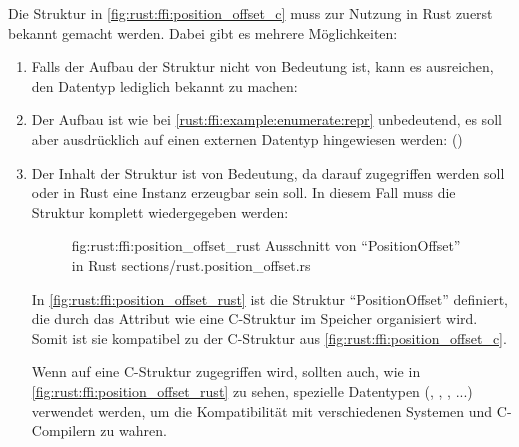 Die Struktur in \autoref{fig:rust:ffi:position_offset_c} muss zur Nutzung in Rust zuerst bekannt gemacht werden.
Dabei gibt es mehrere Möglichkeiten:
\begin{enumerate}
	\item Falls der Aufbau der Struktur nicht von Bedeutung ist, kann es ausreichen, den Datentyp lediglich bekannt zu machen:  \label{rust:ffi:example:enumerate:repr}
	
	\item Der Aufbau ist wie bei \autoref{rust:ffi:example:enumerate:repr} unbedeutend, es soll aber ausdrücklich auf einen externen Datentyp hingewiesen werden:  \cite{rust:github:extern_type} ()
	
	\item Der Inhalt der Struktur ist von Bedeutung, da darauf zugegriffen werden soll oder in Rust eine Instanz erzeugbar sein soll. In diesem Fall muss die Struktur komplett wiedergegeben werden:
	\begin{figure}[H]
		\rustcinclude
			{fig:rust:ffi:position_offset_rust}
			{Ausschnitt von \enquote{PositionOffset}  in Rust}
			{sections/rust.position_offset.rs}
	\end{figure}
	
	In \autoref{fig:rust:ffi:position_offset_rust} ist die Struktur \enquote{PositionOffset} definiert,
	die durch das Attribut  wie eine C-Struktur im Speicher organisiert wird.
	Somit ist sie kompatibel zu der C-Struktur aus \autoref{fig:rust:ffi:position_offset_c}.
	
	Wenn auf eine C-Struktur zugegriffen wird, sollten auch, wie in \autoref{fig:rust:ffi:position_offset_rust} zu sehen, spezielle Datentypen (, , , ...) verwendet werden, um die Kompatibilität mit verschiedenen Systemen und C-Compilern zu wahren. 
	
	
	

\end{enumerate}

